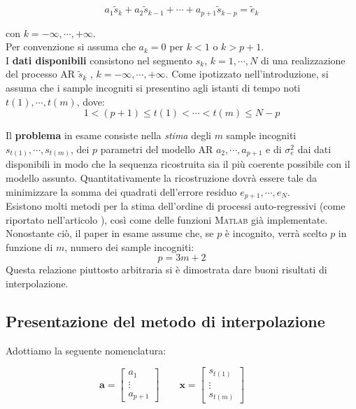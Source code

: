 \documentclass{article}
\begin{document}
\begin{equation}
a_{1}\tilde{s}_{k} + a_{2}\tilde{s}_{k-1} + \cdots + a_{p+1}\tilde{s}_{k-p} = \tilde{e}_{k}
\end{equation}

con $k =  -\infty , \cdots , +\infty $. 
\\
Per convenzione si assuma che $a_{k}=0$ per $k < 1$ o $k > p+1$. 
\medskip 
\\
I \textbf{dati disponibili} consistono nel segmento $s_{k}$, $k=1, \cdots , N$ di una realizzazione del processo AR $\tilde{s}_{k}$ , $k =  -\infty , \cdots , +\infty$. 
Come ipotizzato nell'introduzione, si assuma che i sample incogniti si presentino  agli istanti di tempo noti $t(1), \cdots , t(m)$, dove: 
\[1< (p+1) \leq t(1) < \cdots < t(m) \leq N-p \]


Il \textbf{problema} in esame consiste nella \emph{stima} degli $m$ sample incogniti\linebreak
$s_{t(1)}, \cdots , s_{t(m)} $, dei $p$ parametri del modello AR $a_{2}, \cdots ,a_{p+1}$ e di $\sigma_{e}^{2}$ dai dati disponibili in modo che la sequenza ricostruita sia il più coerente possibile con il modello assunto. Quantitativamente la ricostruzione dovrà essere tale da minimizzare la somma dei quadrati dell'errore residuo $e_{p+1}, \cdots ,e_{N}$.
\\
Esistono molti metodi per la stima dell'ordine di processi auto-regressivi (come riportato nell'articolo \cite{art4}), così come delle funzioni \textsc{Matlab} già implementate. Nonostante ciò, il paper \cite{paper_1986} in esame assume che, se $p$ è incognito, verrà scelto $p$ in funzione di $m$, numero dei sample incogniti:
\begin{equation}
p=3m+2
\end{equation}
Questa relazione piuttosto arbitraria si è dimostrata dare buoni risultati di interpolazione.

	\subsection{Presentazione del metodo di interpolazione} \label{presentazione}
Adottiamo la seguente nomenclatura:

\[ \textbf{a} = 
\left[
\begin{array}{c}
a_{1} \\ \vdots \\ a_{p+1}
\end{array}
\right] \qquad 
\textbf{x} = 
\left[
\begin{array}{c}
s_{t(1)} \\ \vdots \\ s_{t(m)}
\end{array}
\right] \qquad 
\]
\end{document}
